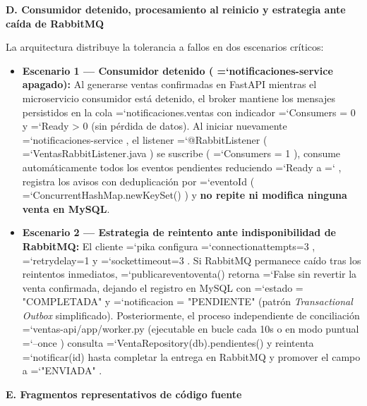\documentclass[11pt,a4paper]{article}
\renewcommand{\_}{\oldunderscore\allowbreak}
\DeclareRobustCommand{\texttt}[1]{%
  {\upshape\ttfamily\fontsize{9}{10.8}\selectfont\hyphenchar\font=`\-\relax #1}%
}
\begin{document}
\vspace{0.2cm}
\noindent\textbf{D. Consumidor detenido, procesamiento al reinicio y estrategia ante caída de RabbitMQ}

\noindent La arquitectura distribuye la tolerancia a fallos en dos escenarios críticos:
\begin{itemize}[leftmargin=*,itemsep=2pt,topsep=1pt]
  \item \textbf{Escenario 1 — Consumidor detenido (\texttt{notificaciones-service} apagado):} Al generarse ventas confirmadas en FastAPI mientras el microservicio consumidor está detenido, el broker mantiene los mensajes persistidos en la cola \texttt{notificaciones.\allowbreak{}ventas} con indicador \texttt{Consumers = 0} y \texttt{Ready > 0} (sin pérdida de datos). Al iniciar nuevamente \texttt{notificaciones-service}, el listener \texttt{@RabbitListener} (\texttt{VentasRabbitListener.\allowbreak{}java}) se suscribe (\texttt{Consumers = 1}), consume automáticamente todos los eventos pendientes reduciendo \texttt{Ready} a \texttt{0}, registra los avisos con deduplicación por \texttt{eventoId} (\texttt{ConcurrentHashMap.\allowbreak{}newKeySet()}) y \textbf{no repite ni modifica ninguna venta en MySQL}.
  \item \textbf{Escenario 2 — Estrategia de reintento ante indisponibilidad de RabbitMQ:} El cliente \texttt{pika} configura \texttt{connection\_attempts=\allowbreak{}3}, \texttt{retry\_delay=\allowbreak{}1} y \texttt{socket\_timeout=\allowbreak{}3}. Si RabbitMQ permanece caído tras los reintentos inmediatos, \texttt{publicar\_evento\_venta()} retorna \texttt{False} sin revertir la venta confirmada, dejando el registro en MySQL con \texttt{estado = "COMPLETADA"} y \texttt{notificacion = "PENDIENTE"} (patrón \textit{Transactional Outbox} simplificado). Posteriormente, el proceso independiente de conciliación \texttt{ventas-api/\allowbreak{}app/\allowbreak{}worker.\allowbreak{}py} (ejecutable en bucle cada 10s o en modo puntual \texttt{--once}) consulta \texttt{VentaRepository(db).\allowbreak{}pendientes()} y reintenta \texttt{notificar(id)} hasta completar la entrega en RabbitMQ y promover el campo a \texttt{"ENVIADA"}.
\end{itemize}

\vspace{0.2cm}
\noindent\textbf{E. Fragmentos representativos de código fuente}
\end{document}
